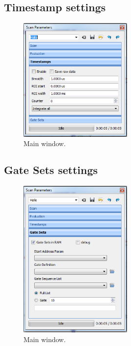 \documentclass{scrartcl}
\begin{document}
\subsection{Timestamp settings}
\begin{figure}[htbp]
\begin{center}
\includegraphics[width=0.5\textwidth]{ScanParametersTimestamps}
\end{center}
\caption{\label{PulseProgram} Main window.}
\end{figure}


\subsection{Gate Sets settings}
\begin{figure}[htbp]
\begin{center}
\includegraphics[width=0.5\textwidth]{ScanParametersGateSets}
\end{center}
\caption{\label{PulseProgram} Main window.}
\end{figure}
\end{document}
